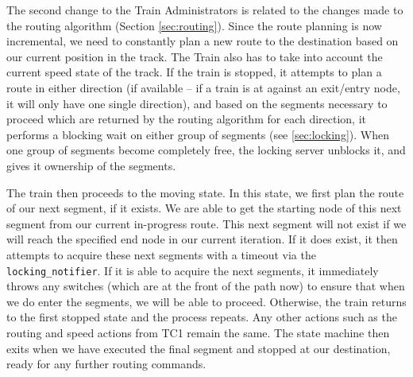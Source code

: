 \documentclass[12pt, titlepage]{article}
\begin{document}
    The second change to the Train Administrators is related to the changes made to the routing algorithm (Section \ref{sec:routing}). Since the route planning is now incremental, we need to constantly plan a new route to the destination based on our current position in the track. The Train also has to take into account the current speed state of the track. If the train is stopped, it attempts to plan a route in either direction (if available -- if a train is at against an exit/entry node, it will only have one single direction), and based on the segments necessary to proceed which are returned by the routing algorithm for each direction, it performs a blocking wait on either group of segments (see \ref{sec:locking}). When one group of segments become completely free, the locking server unblocks it, and gives it ownership of the segments. 
    
    The train then proceeds to the moving state. In this state, we first plan the route of our next segment, if it exists. We are able to get the starting node of this next segment from our current in-progress route. This next segment will not exist if we will reach the specified end node in our current iteration. If it does exist, it then attempts to acquire these next segments with a timeout via the \verb`locking_notifier`. If it is able to acquire the next segments, it immediately throws any switches (which are at the front of the path now) to ensure that when we do enter the segments, we will be able to proceed. Otherwise, the train returns to the first stopped state and the process repeats. Any other actions such as the routing and speed actions from TC1 remain the same. The state machine then exits when we have executed the final segment and stopped at our destination, ready for any further routing commands.
\end{document}
